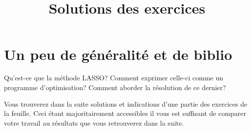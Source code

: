 \documentclass[11pt, a4paper]{article}
\begin{document}
\section{Un peu de généralité et de biblio}

\begin{question}
  Qu'est-ce que la méthode LASSO? Comment exprimer celle-ci comme un
  programme d'optimisation? Comment aborder la résolution de ce
  dernier?
\end{question}

\pretitle{\vspace{-2\baselineskip} \begin{center}}
\title{%
  { \huge Solutions des exercices}%
}
\posttitle{
\end{center}
  \vspace{.5\baselineskip}
  \rule{\textwidth}{1.5pt}
  \vspace{-5\baselineskip}
}

\maketitle\thispagestyle{fancy}

\noindent Vous trouverez dans la suite solutions et indications d'une
partie des exercices de la feuille. Ceci étant majoritairement
accessibles il vous est suffisant de comparer votre travail au
résultats que vous retrouverez dans la suite. 

\printsolutions
\end{document}
